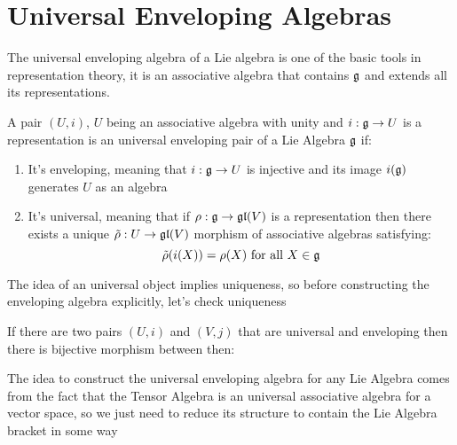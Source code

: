 \section{Universal Enveloping Algebras}
The universal enveloping algebra of a Lie algebra is one of the basic tools in representation theory, it is an associative algebra that contains $\mathfrak{g}$ and extends all its representations.
\begin{defi}
	A pair $(U,i)$, $U$ being an associative algebra with unity and $i:\mathfrak{g} \rightarrow U$ is a representation is
	 an universal enveloping pair of a Lie Algebra $\mathfrak{g}$ if:
	\begin{enumerate}
		\item It's enveloping, meaning that $i:\mathfrak{g} \rightarrow U$ is injective and its image $i(\mathfrak{g})$ generates $U$ as an algebra
		\item It's universal, meaning that if $\rho:\mathfrak{g} \rightarrow \mathfrak{gl}(V)$ is a representation then there exists a unique $\tilde{\rho}:U \rightarrow \mathfrak{gl}(V)$ morphism of associative algebras satisfying:
		$$ \tilde{\rho}(i(X)) = \rho(X) \text{ for all }X \in \mathfrak{g}$$
	\end{enumerate}
	\begin{center}
	\end{center}
\end{defi}
The idea of an universal object implies uniqueness, so before constructing the enveloping algebra explicitly, let's check uniqueness
\begin{remark}
	If there are two pairs $(U,i)$ and $(V,j)$ that are universal and enveloping then there is bijective morphism between then:
\end{remark}
\begin{center}
\end{center}
The idea to construct the universal enveloping algebra for any Lie Algebra comes from the fact that the Tensor Algebra is an universal associative algebra for a vector space, so we just need to reduce its structure to contain the Lie Algebra bracket in some way
